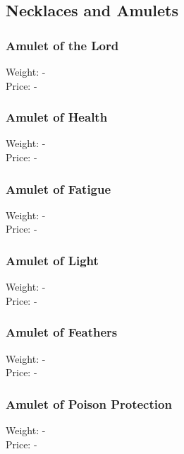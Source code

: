\subsection{Necklaces and Amulets}

\subsubsection{Amulet of the Lord}
Weight: -\\
Price: -\\

\subsubsection{Amulet of Health}
Weight: -\\
Price: -\\

\subsubsection{Amulet of Fatigue}
Weight: -\\
Price: -\\

\subsubsection{Amulet of Light}
Weight: -\\
Price: -\\

\subsubsection{Amulet of Feathers}
Weight: -\\
Price: -\\

\subsubsection{Amulet of Poison Protection}
Weight: -\\
Price: -\\